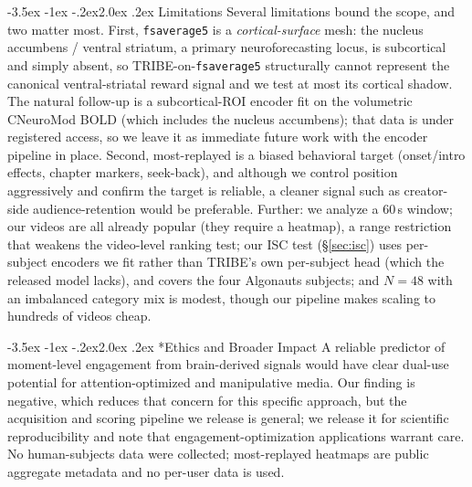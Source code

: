 \documentclass[11pt]{article}
\makeatletter
\renewcommand\section{\@startsection{section}{1}{\z@}%
  {-3.5ex \@plus -1ex \@minus -.2ex}{2.0ex \@plus.2ex}%
  {\normalfont\large\sffamily\bfseries}}
\makeatother
\begin{document}
\section{Limitations}\label{sec:limits}
Several limitations bound the scope, and two matter most. First, \texttt{fsaverage5} is a
\emph{cortical-surface} mesh: the nucleus accumbens / ventral striatum, a primary neuroforecasting
locus, is subcortical and simply absent, so TRIBE-on-\texttt{fsaverage5} structurally cannot
represent the canonical ventral-striatal reward signal and we test at most its cortical shadow. The
natural follow-up is a subcortical-ROI encoder fit on the volumetric CNeuroMod BOLD (which includes
the nucleus accumbens); that data is under registered access, so we leave it as immediate future
work with the encoder pipeline in place. Second, most-replayed is a biased behavioral target (onset/intro
effects, chapter markers, seek-back), and although we control position aggressively and confirm the
target is reliable, a cleaner signal such as creator-side audience-retention would be preferable.
Further: we analyze a $60$\,s window; our videos are all already popular (they require a heatmap),
a range restriction that weakens the video-level ranking test; our ISC test (\S\ref{sec:isc}) uses
per-subject encoders we fit rather than TRIBE's own per-subject head (which the released model lacks),
and covers the four Algonauts subjects; and $N=48$ with an imbalanced category mix is modest, though
our pipeline makes scaling to hundreds of videos cheap.

\section*{Ethics and Broader Impact}
A reliable predictor of moment-level engagement from brain-derived signals would have clear
dual-use potential for attention-optimized and manipulative media. Our finding is negative, which
reduces that concern for this specific approach, but the acquisition and scoring pipeline we release
is general; we release it for scientific reproducibility and note that engagement-optimization
applications warrant care. No human-subjects data were collected; most-replayed heatmaps are public
aggregate metadata and no per-user data is used.
\end{document}
